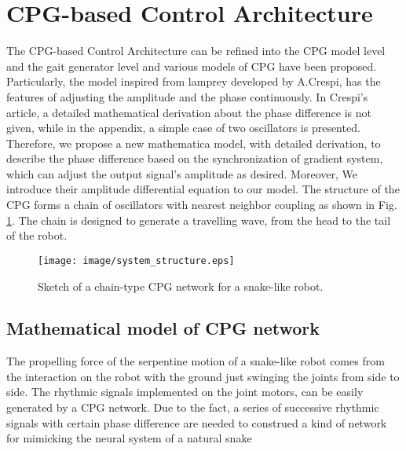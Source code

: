 \documentclass[letterpaper, 10 pt, conference]{ieeeconf}
\begin{document}
\section{CPG-based Control Architecture}

The CPG-based Control Architecture can be refined into the CPG model level and the gait generator level and various models of CPG have been proposed.
Particularly, the model inspired from lamprey developed by A.Crespi\cite{salamander_science}, has the features of adjusting the amplitude and the phase continuously. In Crespi's article, a detailed mathematical derivation about the phase difference is not given, while in the appendix, a simple case of two oscillators is presented. Therefore, we propose a new mathematica model, with detailed derivation, to describe the phase difference based on the synchronization of gradient system, which can adjust the output signal's amplitude as desired. Moreover, We introduce their amplitude differential equation to our model.
The structure of the CPG forms a chain of oscillators with nearest neighbor coupling as shown in Fig. \ref{Sketch of chain-type CPG}. The chain is designed to generate a travelling wave, from the head to the tail of the robot.
\begin{figure}[thpb]
    \centering
    \texttt{[image: image/system\_structure.eps]}
    \caption{Sketch of a chain-type CPG network for a snake-like robot.}
    \label{Sketch of chain-type CPG}
\end{figure}

\subsection{Mathematical model of CPG network}
The propelling force of the serpentine motion of a snake-like robot comes from the interaction on the robot with the ground just swinging the joints from side to side. The rhythmic signals implemented on the joint motors, can be easily generated by a CPG network.
Due to the fact, a series of successive rhythmic signals with certain phase difference are needed to construed a kind of network for mimicking the neural system of a natural snake
\end{document}
